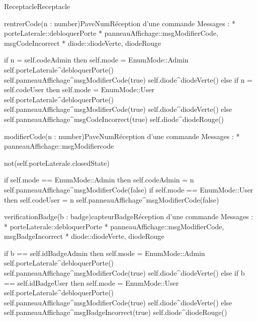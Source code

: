 \begin{OM}{Receptacle}{Receptacle}

\begin{OMOperation}{rentrerCode(n : number)}{PaveNum}{Réception d'une commande}
Messages :
* porteLaterale::{debloquerPorte}
* panneauAffichage::{msgModifierCode, msgCodeIncorrect}
* diode::{diodeVerte, diodeRouge}
\begin{OMPre}
\end{OMPre}
\begin{OMPost}
if n = self.codeAdmin then
self.mode = EnumMode::Admin
self.porteLaterale^debloquerPorte()
self.panneauAffichage^msgModifierCode(true)
self.diode^diodeVerte()
else if n = self.codeUser then
self.mode = EnumMode::User
self.porteLaterale^debloquerPorte()
self.panneauAffichage^msgModifierCode(true)
self.diode^diodeVerte()
else
self.panneauAffichage^msgCodeIncorrect(true)
self.diode^diodeRouge()
\end{OMPost}
\end{OMOperation}

\begin{OMOperation}{modifierCode(n : number)}{PaveNum}{Réception d'une commande}
Messages :
* panneauAffichage::{msgModifiercode}
\begin{OMPre}
not(self.porteLaterale.closedState)
\end{OMPre}
\begin{OMPost}
        if self.mode == EnumMode::Admin then
                self.codeAdmin = n
self.panneauAffichage^msgModifierCode(false)
        if self.mode == EnumMode::User then
                self.codeUser = n
self.panneauAffichage^msgModifierCode(false)
\end{OMPost}
\end{OMOperation}

\begin{OMOperation}{verificationBadge(b : badge)}{capteurBadge}{Réception d'une commande}
Messages :
* porteLaterale::{debloquerPorte}
* panneauAffichage::{msgModifierCode, msgBadgeIncorrect}
* diode::{diodeVerte, diodeRouge}
\begin{OMPre}
\end{OMPre}
\begin{OMPost}
if b == self.idBadgeAdmin then
self.mode = EnumMode::Admin
self.porteLaterale^debloquerPorte()
self.panneauAffichage^msgModifierCode(true)
self.diode^diodeVerte()
else if b == self.idBadgeUser then
self.mode = EnumMode::User
self.porteLaterale^debloquerPorte()
self.panneauAffichage^msgModifierCode(true)
self.diode^diodeVerte()
else
self.panneauAffichage^msgBadgeIncorrect(true)
self.diode^diodeRouge()
\end{OMPost}
\end{OMOperation}


\end{OM}
